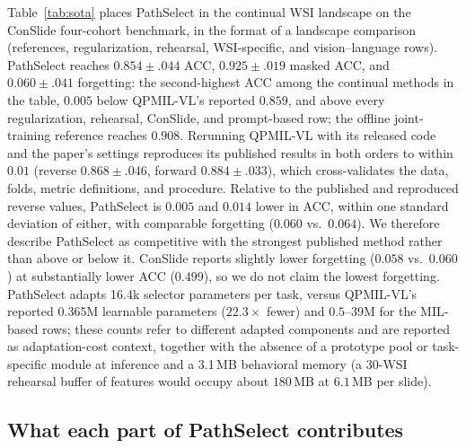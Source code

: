 \documentclass{article}
\begin{document}
Table~\ref{tab:sota} places PathSelect in the continual WSI landscape on the ConSlide four-cohort benchmark, in the format of a landscape comparison (references, regularization, rehearsal, WSI-specific, and vision--language rows). PathSelect reaches $0.854{\pm}.044$ ACC, $0.925{\pm}.019$ masked ACC, and $0.060{\pm}.041$ forgetting: the second-highest ACC among the continual methods in the table, $0.005$ below QPMIL-VL's reported $0.859$, and above every regularization, rehearsal, ConSlide, and prompt-based row; the offline joint-training reference reaches $0.908$. Rerunning QPMIL-VL with its released code and the paper's settings reproduces its published results in both orders to within $0.01$ (reverse $0.868{\pm}.046$, forward $0.884{\pm}.033$), which cross-validates the data, folds, metric definitions, and procedure. Relative to the published and reproduced reverse values, PathSelect is $0.005$ and $0.014$ lower in ACC, within one standard deviation of either, with comparable forgetting ($0.060$ vs.\ $0.064$). We therefore describe PathSelect as competitive with the strongest published method rather than above or below it. ConSlide reports slightly lower forgetting ($0.058$ vs.\ $0.060$) at substantially lower ACC ($0.499$), so we do not claim the lowest forgetting. PathSelect adapts 16.4k selector parameters per task, versus QPMIL-VL's reported $0.365$M learnable parameters ($22.3\times$ fewer) and $0.5$--$39$M for the MIL-based rows; these counts refer to different adapted components and are reported as adaptation-cost context, together with the absence of a prototype pool or task-specific module at inference and a 3.1\,MB behavioral memory (a 30-WSI rehearsal buffer of features would occupy about $180$\,MB at $6.1$\,MB per slide).

\subsection{What each part of PathSelect contributes}
\label{ssec:ablation}
\end{document}
